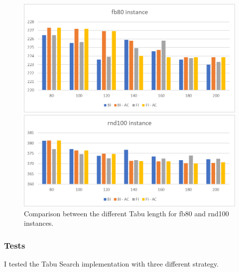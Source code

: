 	
	\begin{figure}[p]
		\centering
		\includegraphics[width=\linewidth]{img/TS-calibration-fb80}
	
	\vspace{2cm}
	
		\includegraphics[width=\linewidth]{img/TS-calibration-rnd100}
		\caption{Comparison between the different Tabu length for fb80 and rnd100 instances.}
		\label{fig:ts-calibration-rnd100}
	\end{figure}
	

\newpage

	\subsubsection{Tests}
		I tested the Tabu Search implementation with three different strategy.
		
